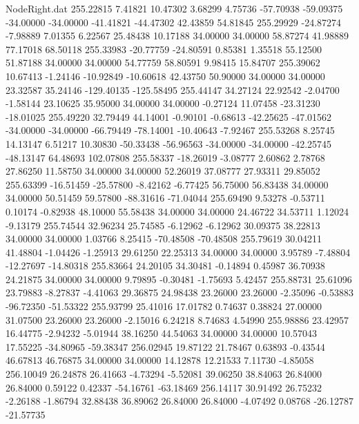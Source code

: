 \begin{filecontents}{NodeRight.dat}
 255.22815    7.41821   10.47302     3.68299    4.75736  -57.70938  -59.09375  -34.00000  -34.00000  -41.41821  -44.47302   42.43859   54.81845
 255.29929  -24.87274   -7.98889     7.01355    6.22567   25.48438   10.17188   34.00000   34.00000   58.87274   41.98889   77.17018   68.50118
 255.33983  -20.77759  -24.80591     0.85381    1.35518   55.12500   51.87188   34.00000   34.00000   54.77759   58.80591    9.98415   15.84707
 255.39062   10.67413   -1.24146   -10.92849  -10.60618   42.43750   50.90000   34.00000   34.00000   23.32587   35.24146 -129.40135 -125.58495
 255.44147   34.27124   22.92542    -2.04700   -1.58144   23.10625   35.95000   34.00000   34.00000   -0.27124   11.07458  -23.31230  -18.01025
 255.49220   32.79449   44.14001    -0.90101   -0.68613  -42.25625  -47.01562  -34.00000  -34.00000  -66.79449  -78.14001  -10.40643   -7.92467
 255.53268    8.25745   14.13147     6.51217   10.30830  -50.33438  -56.96563  -34.00000  -34.00000  -42.25745  -48.13147   64.48693  102.07808
 255.58337  -18.26019   -3.08777     2.60862    2.78768   27.86250   11.58750   34.00000   34.00000   52.26019   37.08777   27.93311   29.85052
 255.63399  -16.51459  -25.57800    -8.42162   -6.77425   56.75000   56.83438   34.00000   34.00000   50.51459   59.57800  -88.31616  -71.04044
 255.69490    9.53278   -0.53711     0.10174   -0.82938   48.10000   55.58438   34.00000   34.00000   24.46722   34.53711    1.12024   -9.13179
 255.74544   32.96234   25.74585    -6.12962   -6.12962   30.09375   38.22813   34.00000   34.00000    1.03766    8.25415  -70.48508  -70.48508
 255.79619   30.04211   41.48804    -1.04426   -1.25913   29.61250   22.25313   34.00000   34.00000    3.95789   -7.48804  -12.27697  -14.80318
 255.83664   24.20105   34.30481    -0.14894    0.45987   36.70938   24.21875   34.00000   34.00000    9.79895   -0.30481   -1.75693    5.42457
 255.88731   25.61096   23.79883    -8.27837   -4.41063   29.36875   24.98438   23.26000   23.26000   -2.35096   -0.53883  -96.72350  -51.53322
 255.93799   25.41016   17.01782     0.74637    0.38824   27.00000   31.07500   23.26000   23.26000   -2.15016    6.24218    8.74683    4.54990
 255.98886   23.42957   16.44775    -2.94232   -5.01944   38.16250   44.54063   34.00000   34.00000   10.57043   17.55225  -34.80965  -59.38347
 256.02945   19.87122   21.78467     0.63893   -0.43544   46.67813   46.76875   34.00000   34.00000   14.12878   12.21533    7.11730   -4.85058
 256.10049   26.24878   26.41663    -4.73294   -5.52081   39.06250   38.84063   26.84000   26.84000    0.59122    0.42337  -54.16761  -63.18469
 256.14117   30.91492   26.75232    -2.26188   -1.86794   32.88438   36.89062   26.84000   26.84000   -4.07492    0.08768  -26.12787  -21.57735

\end{filecontents}

